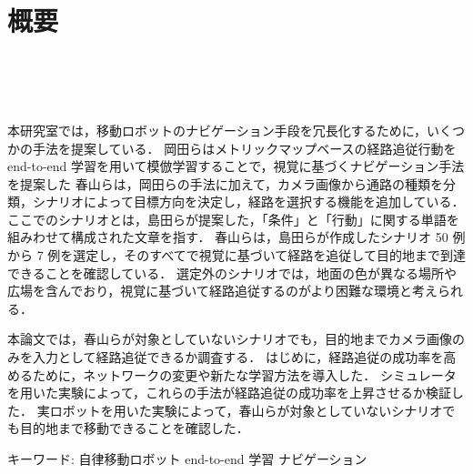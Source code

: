 \chapter*{概要}
\thispagestyle{empty}
%
\begin{center}
  \scalebox{1.0}{視覚と行動のend-to-end学習により}\\
  \vspace{-1.0zh}
  \scalebox{1.0}{経路追従行動を模倣する手法の提案}\\
  \scalebox{1.0}{-経路選択の成功率向上を意図したネットワークの変更と実験的評価-}\\
\end{center}
\vspace{1.0zh}

本研究室では，移動ロボットのナビゲーション手段を冗長化するために，いくつかの手法を提案している．
岡田らはメトリックマップベースの経路追従行動を end-to-end 学習を用いて模倣学習することで，視覚に基づくナビゲーション手法を提案した
春山らは，岡田らの手法に加えて，カメラ画像から通路の種類を分類，シナリオによって目標方向を決定し，経路を選択する機能を追加している．
ここでのシナリオとは，島田らが提案した，「条件」と「行動」に関する単語を組みわせて構成された文章を指す．
春山らは，島田らが作成したシナリオ 50 例から 7 例を選定し，そのすべてで視覚に基づいて経路を追従して目的地まで到達できることを確認している．
選定外のシナリオでは，地面の色が異なる場所や広場を含んでおり，視覚に基づいて経路追従するのがより困難な環境と考えられる．

本論文では，春山らが対象としていないシナリオでも，目的地までカメラ画像のみを入力として経路追従できるか調査する．
はじめに，経路追従の成功率を高めるために，ネットワークの変更や新たな学習方法を導入した．
シミュレータを用いた実験によって，これらの手法が経路追従の成功率を上昇させるか検証した．
実ロボットを用いた実験によって，春山らが対象としていないシナリオでも目的地まで移動できることを確認した．

キーワード: 自律移動ロボット end-to-end 学習 ナビゲーション
%
\newpage

